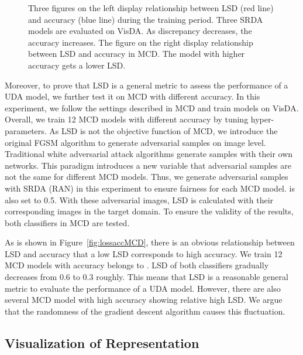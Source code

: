 \documentclass[10pt,twocolumn,letterpaper]{article}
\begin{document}
\begin{figure*}[h]
  \centering
\caption{Three figures on the left display relationship between LSD (red line) and accuracy (blue line) during the training period. Three SRDA models are evaluated on VisDA. As discrepancy decreases, the accuracy increases. The figure on the right display relationship between LSD and accuracy in MCD. The model with higher accuracy gets a lower LSD.}
  \label{fig:lossacc} \end{figure*} 

Moreover, to prove that LSD is a general metric to assess the performance of a UDA model, we further test it on MCD with different accuracy. In this experiment, we follow the settings described in MCD and train models on VisDA. Overall, we train 12 MCD models with different accuracy by tuning hyper-parameters. As LSD is not the objective function of MCD, we introduce the original FGSM algorithm to generate adversarial samples on image level. Traditional white adversarial attack algorithms generate samples with their own networks. This paradigm introduces a new variable that adversarial samples are not the same for different MCD models. Thus, we generate adversarial samples with SRDA (RAN) in this experiment to ensure fairness for each MCD model.  is also set to 0.5. With these adversarial images, LSD is calculated with their corresponding images in the target domain. To ensure the validity of the results, both classifiers in MCD are tested.

As is shown in Figure~\ref{fig:lossaccMCD}, there is an obvious relationship between LSD and accuracy that a low LSD corresponds to high accuracy. We train 12 MCD models with accuracy belongs to   
. LSD of both classifiers  gradually decreases from 0.6 to 0.3 roughly. This means that LSD is a reasonable general metric to evaluate the performance of a UDA model. However, there are also several MCD model with high accuracy showing relative high LSD. We argue that the randomness of the gradient descent algorithm causes this fluctuation.

\subsection{Visualization of Representation}
\end{document}
